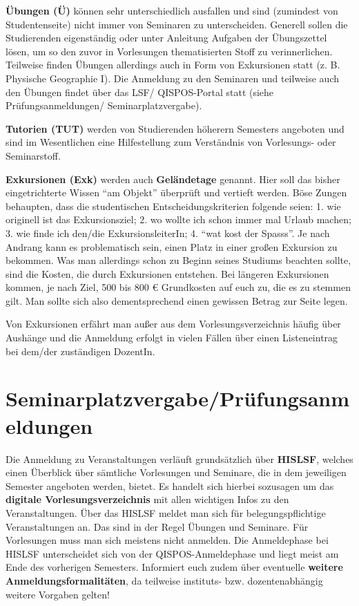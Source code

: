 \textbf{Übungen (Ü)} können sehr unterschiedlich ausfallen und sind (zumindest von Studentenseite) nicht immer von Seminaren zu unterscheiden. Generell sollen die Studierenden eigenständig oder unter Anleitung Aufgaben der Übungszettel lösen, um so den zuvor in Vorlesungen thematisierten Stoff zu verinnerlichen. Teilweise finden Übungen allerdings auch in Form von Exkursionen statt (z. B. Physische Geographie I). Die Anmeldung zu den Seminaren und teilweise auch den Übungen findet über das LSF/ QISPOS-Portal statt (siehe Prüfungsanmeldungen/ Seminarplatzvergabe).

\textbf{Tutorien (TUT)} werden von Studierenden höherern Semesters angeboten und sind im Wesentlichen eine Hilfestellung zum Verständnis von Vorlesungs- oder Seminarstoff.

\textbf{Exkursionen (Exk)} werden auch \textbf{Geländetage} genannt. Hier soll das bisher eingetrichterte Wissen \enquote{am Objekt} überprüft und vertieft werden. Böse Zungen behaupten, dass die studentischen Entscheidungskriterien folgende seien: 1. wie originell ist das Exkursionsziel; 2. wo wollte ich schon immer mal Urlaub machen; 3. wie finde ich den/die ExkursionsleiterIn; 4. \enquote{wat kost der Spasss}. Je nach Andrang kann es problematisch sein, einen Platz in einer großen Exkursion zu bekommen. Was man allerdings schon zu Beginn seines Studiums beachten sollte, sind die Kosten, die durch Exkursionen entstehen. Bei längeren Exkursionen kommen, je nach Ziel, 500 bis 800 € Grundkosten auf euch zu, die es zu stemmen gilt. Man sollte sich also dementsprechend einen gewissen Betrag zur Seite legen.

Von Exkursionen erfährt man außer aus dem Vorlesungsverzeichnis häufig über Aushänge und die Anmeldung erfolgt in vielen Fällen über einen Listeneintrag bei dem/der zuständigen DozentIn.

\section{Seminarplatzvergabe/Prüfungsanmeldungen}

Die Anmeldung zu Veranstaltungen verläuft grundsätzlich über \textbf{HISLSF}, welches einen Überblick über sämtliche Vorlesungen und Seminare, die in dem jeweiligen Semester angeboten werden, bietet. Es handelt sich hierbei sozusagen um das \textbf{digitale Vorlesungsverzeichnis} mit allen wichtigen Infos zu den Veranstaltungen. Über das HISLSF meldet man sich für belegungspflichtige Veranstaltungen an. Das sind in der Regel Übungen und Seminare. Für Vorlesungen muss man sich meistens nicht anmelden. Die Anmeldephase bei HISLSF unterscheidet sich von der QISPOS-Anmeldephase und liegt meist am Ende des vorherigen Semesters. Informiert euch zudem über eventuelle \textbf{weitere Anmeldungsformalitäten}, da teilweise instituts- bzw. dozentenabhängig weitere Vorgaben gelten!

